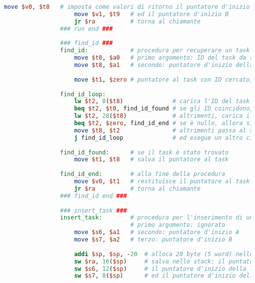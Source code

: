 \begin{center}
\begin{lstlisting}[language=mips, gobble=14, stepnumber=1]
                    move $v0, $t8   # imposta come valori di ritorno il puntatore d'inizio A
                    move $v1, $t9   # ed il puntatore d'inizio B
                    jr $ra          # torna al chiamante
                ### run end ###
                
                ### find_id ###
                find_id:            # procedura per recuperare un task con un ID specifico
                    move $t0, $a0   # primo argomento: ID del task da recuperare
                    move $t8, $a1   # secondo: puntatore d'inizio della lista A
                    
                    move $t1, $zero # puntatore al task con ID cercato, inizializzato come nullo
                    
                find_id_loop:
                    lw $t2, 8($t8)              # carica l'ID del task attuale
                    beq $t2, $t0, find_id_found # se gli ID coincidono, allora il task è stato trovato
                    lw $t2, 28($t8)             # altrimenti, carica il puntatore al task successivo
                    beq $t2, $zero, find_id_end # se è nullo, allora si è raggiunta la fine senza trovare il task
                    move $t8, $t2               # altrimenti passa al successivo
                    j find_id_loop              # ed esegue un altro ciclo
                    
                find_id_found:      # se il task è stato trovato
                    move $t1, $t8   # salva il puntatore al task
                    
                find_id_end:        # alla fine della procedura
                    move $v0, $t1   # restituisce il puntatore al task trovato, o null se non è stato trovato
                    jr $ra          # torna al chiamante
                ### find_id end ###
                
                ### insert_task ###
                insert_task:		# procedura per l'inserimento di un nuovo task
                					# primo argomento: ignorato
                    move $s6, $a1	# secondo: puntatore d'inizio A
                    move $s7, $a2	# terzo: puntatore d'inizio B
                    
                    addi $sp, $sp, -20	# alloca 20 byte (5 word) nello stack frame
                    sw $ra, 16($sp)		# salva nello stack: il puntatore di ritorno al chiamante
                    sw $s6, 12($sp)		# il puntatore d'inizio della lista A
                    sw $s7, 8($sp)		# ed il puntatore d'inizio della lista B
                

\end{lstlisting}
\end{center}
